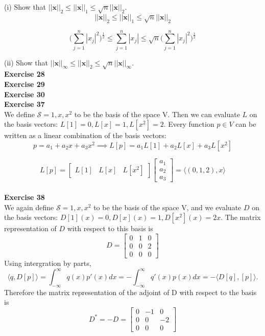 \documentclass[letterpaper,12pt]{article}
\let\vec\mathbf
\theoremstyle{definition}
\begin{document}
(i) Show that $||\vec{x}||_2 \leq ||\vec{x}||_1 \leq \sqrt{n} ||\vec{x}||_2$. \\
\begin{equation*}
  ||\vec{x}||_2 \leq ||\vec{x}||_1 \leq \sqrt{n} ||\vec{x}||_2
\end{equation*}

\begin{equation*}
  \Big (\sum_{j=1}^n |x_j|^2 \Big) ^{\frac{1}{2}} \leq \sum_{j=1}^n |x_j| \leq \sqrt{n} \Big (\sum_{j=1}^n |x_j|^2 \Big) ^{\frac{1}{2}}
\end{equation*}

(ii) Show that $||\vec{x}||_\infty \leq ||\vec{x}||_2 \leq \sqrt{n} ||\vec{x}||_\infty$. \\

\textbf{Exercise 28} \\

\textbf{Exercise 29} \\

\textbf{Exercise 30} \\

\textbf{Exercise 37} \\
We define $\mathcal{S} = {1, x, x^2}$ to be the basis of the space V. Then we can evaluate $L$ on the basis vectors: $L[1] = 0, L[x] = 1, L[x^2] = 2$. Every function $p \in V$ can be written as a linear combination of the basis vectors:
\begin{equation*}
  p = a_1 + a_2 x + a_3 x^2 \implies L[p] = a_1 L[1] + a_2 L[x] + a_3 L[x^2]
\end{equation*}

\[
L[p] =
\begin{bmatrix}
  L[1] & L[x] & L[x^2]
\end{bmatrix}
\begin{bmatrix}
  a_1 \\
  a_2 \\
  a_3
\end{bmatrix}
= \langle (0, 1, 2), x \rangle
\] \\

\textbf{Exercise 38} \\
We again define $\mathcal{S} = {1, x, x^2}$ to be the basis of the space V, and we evaluate $D$ on the basis vectors: $D[1](x) = 0, D[x](x) = 1, D[x^2](x) = 2x$. The matrix representation of $D$ with respect to this basis is
\[
D =
\begin{bmatrix}
  0 & 1 & 0 \\
  0 & 0 & 2 \\
  0 & 0 & 0
\end{bmatrix}
\]
Using intergration by parts,
\begin{equation*}
  \langle q, D[p] \rangle = \int_{-\infty}^{\infty} q(x) p'(x) dx = - \int_{-\infty}^\infty q'(x) p(x) dx = -\langle D[q], [p] \rangle.
\end{equation*}
Therefore the matrix representation of the adjoint of D with respect to the basis is
\[
D^* = -D =
\begin{bmatrix}
  0 & -1 & 0 \\
  0 & 0 & -2 \\
  0 & 0 & 0
\end{bmatrix}
\]
\end{document}
